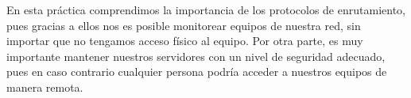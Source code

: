En esta práctica comprendimos la importancia de los protocolos de enrutamiento, pues gracias a ellos nos es posible monitorear equipos de nuestra red, sin importar que no tengamos acceso físico al equipo.\newline
Por otra parte, es muy importante mantener nuestros servidores con un nivel de seguridad adecuado, pues en caso contrario cualquier persona podría acceder a nuestros equipos de manera remota.